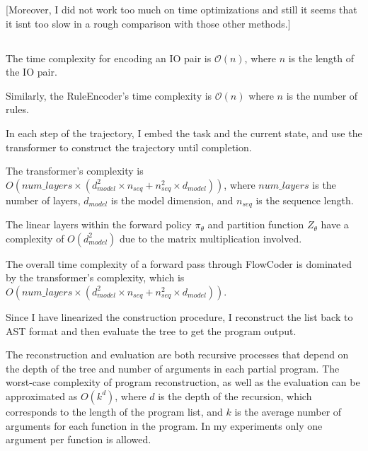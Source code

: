 [Moreover, I did not work too much on time optimizations and still it seems that it isnt too slow in a rough comparison with those other methods.]









\subsection{}


The time complexity for encoding an IO pair is \(\mathcal{O}(n)\), where \(n\) is the length of the IO pair. 

Similarly, the RuleEncoder's time complexity is \(\mathcal{O}(n)\) where \(n\) is the number of rules.

In each step of the trajectory, I embed the task and the current state, and use the transformer to construct the trajectory until completion. 

The transformer's complexity is \(O(num\_layers \times (d_{model}^2 \times n_{seq} + n_{seq}^2 \times d_{model}))\), where \(num\_layers\) is the number of layers, \(d_{model}\) is the model dimension, and \(n_{seq}\) is the sequence length.

The linear layers within the forward policy $\pi_\theta$ and partition function $Z_\theta$ have a complexity of \(O(d_{model}^2)\) due to the matrix multiplication involved.

The overall time complexity of a forward pass through FlowCoder is dominated by the transformer's complexity, which is \(O(num\_layers \times (d_{model}^2 \times n_{seq} + n_{seq}^2 \times d_{model}))\).

Since I have linearized the construction procedure, I reconstruct the list back to AST format and then evaluate the tree to get the program output.

The reconstruction and evaluation are both recursive processes that depend on the depth of the tree and number of arguments in each partial program. 
The worst-case complexity of program reconstruction, as well as the evaluation can be approximated as \(O(k^d)\), where \(d\) is the depth of the recursion, which corresponds to the length of the program list, and \(k\) is the average number of arguments for each function in the program. In my experiments only one argument per function is allowed.

